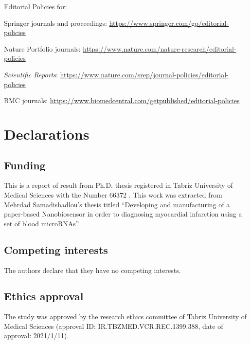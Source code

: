 \documentclass[sn-mathphys,Numbered]{sn-jnl}%
\theoremstyle{thmstyleone}%
\theoremstyle{thmstyletwo}%
\theoremstyle{thmstylethree}%
\begin{document}
\backmatter

\bigskip
\begin{flushleft}%
Editorial Policies for:

\bigskip\noindent
Springer journals and proceedings: \url{https://www.springer.com/gp/editorial-policies}

\bigskip\noindent
Nature Portfolio journals: \url{https://www.nature.com/nature-research/editorial-policies}

\bigskip\noindent
\textit{Scientific Reports}: \url{https://www.nature.com/srep/journal-policies/editorial-policies}

\bigskip\noindent
BMC journals: \url{https://www.biomedcentral.com/getpublished/editorial-policies}
\end{flushleft}






\section*{Declarations}


\subsection*{Funding}
This is a report of result from Ph.D. thesis registered in Tabriz University of Medical Sciences with the Number 66372 . This work was extracted from Mehrdad Samadishadlou's thesis titled “Developing and manufacturing of a paper-based Nanobiosensor in order to diagnosing myocardial infarction using a set of blood microRNAs”.

\subsection*{Competing interests}
The authors declare that they have no competing interests.

\subsection*{Ethics approval}
The study was approved by the research ethics committee of Tabriz University of Medical Sciences (approval ID: IR.TBZMED.VCR.REC.1399.388, date of approval: 2021/1/11).
\end{document}
